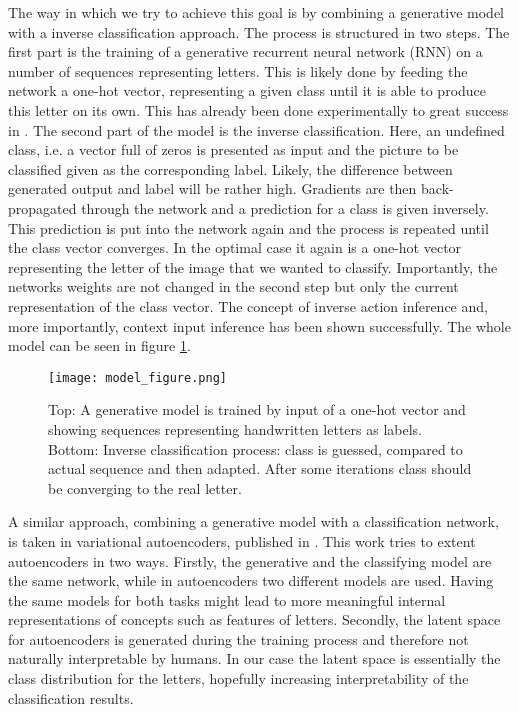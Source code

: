 \documentclass[a4paper, 12pt, english , titlepage]{article}
\begin{document}
	The way in which we try to achieve this goal is by combining a generative model with a inverse classification approach. The process is structured in two steps. The first part is the training of a generative recurrent neural network (RNN) on a number of sequences representing letters. This is likely done by feeding the network a one-hot vector, representing a given class until it is able to produce this letter on its own. This has already been done experimentally to great success in \cite{2018Nikolaus}. The second part of the model is the inverse classification. Here, an undefined class, i.e. a vector full of zeros is presented as input and the picture to be classified given as the corresponding label. Likely, the difference between generated output and label will be rather high. Gradients are then back-propagated through the network and a prediction for a class is given inversely. This prediction is put into the network again and the process is repeated until the class vector converges. In the optimal case it again is a one-hot vector representing the letter of the image that we wanted to classify. Importantly, the networks weights are not changed in the second step but only the current representation of the class vector. The concept of inverse action inference \cite{RocketballOtte2017} and, more importantly, context input inference \cite{REPRISE2018} has been shown successfully. The whole model can be seen in figure \ref{model_figure}.
	\begin{figure}
		\texttt{[image: model\_figure.png]}
		\caption{\small{Top: A generative model is trained by input of a one-hot vector and showing sequences representing handwritten letters as labels. \\
		Bottom: Inverse classification process: class is guessed, compared to actual sequence and then adapted. After some iterations class should be converging to the real letter.}}
		\label{model_figure}
	\end{figure}
	
	A similar approach, combining a generative model with a classification network, is taken in variational autoencoders, published in \cite{2013VAE}. This work tries to extent autoencoders in two ways. Firstly, the generative and the classifying model are the same network, while in autoencoders two different models are used. Having the same models for both tasks might lead to more meaningful internal representations of concepts such as features of letters. Secondly, the latent space for autoencoders is generated during the training process and therefore not naturally interpretable by humans. In our case the latent space is essentially the class distribution for the letters, hopefully increasing interpretability of the classification results. \\
	
\end{document}
